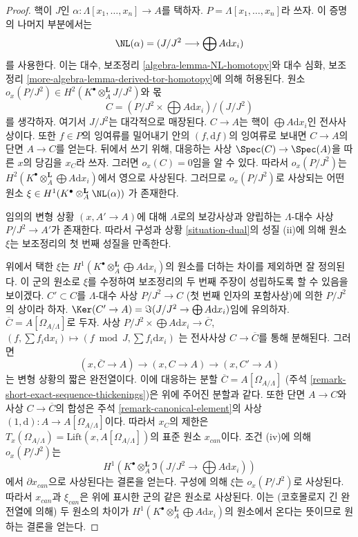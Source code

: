 \begin{proof}
핵이 $J$인 $\alpha : \Lambda[x_1, \ldots, x_n] \to A$를 택하자.
$P = \Lambda[x_1, \ldots, x_n]$라 쓰자. 이 증명의 나머지 부분에서는
$$
\NL(\alpha) = (J/J^2 \longrightarrow \bigoplus A \text{d}x_i)
$$
를 사용한다. 이는 대수, 보조정리 \ref{algebra-lemma-NL-homotopy}와
대수 심화, 보조정리 \ref{more-algebra-lemma-derived-tor-homotopy}에 의해 허용된다.
원소 $o_x(P/J^2) \in H^2(K^\bullet \otimes_A^\mathbf{L} J/J^2)$와 몫
$$
C = (P/J^2 \times \bigoplus A \text{d}x_i)/(J/J^2)
$$
를 생각하자. 여기서 $J/J^2$는 대각적으로 매장된다.
$C \to A$는 핵이 $\bigoplus A\text{d}x_i$인 전사사상이다.
또한 $f \in P$의 잉여류를 밀어내기 안의 $(f, \text{d}f)$의 잉여류로 보내면
$C \to A$의 단면 $A \to C$를 얻는다.
뒤에서 쓰기 위해, 대응하는 사상 $\Spec(C) \to \Spec(A)$을 따른
$x$의 당김을 $x_C$라 쓰자. 그러면 $o_x(C) = 0$임을 알 수 있다.
따라서 $o_x(P/J^2)$는
$H^2(K^\bullet \otimes_A^\mathbf{L} \bigoplus A\text{d}x_i)$에서 영으로 사상된다.
그러므로 $o_x(P/J^2)$로 사상되는 어떤 원소
$\xi \in H^1(K^\bullet \otimes_A^\mathbf{L} \NL(\alpha))$
가 존재한다.

\medskip\noindent
임의의 변형 상황 $(x, A' \to A)$에 대해 $A$로의 보강사상과 양립하는
$\Lambda$-대수 사상 $P/J^2 \to A'$가 존재한다.
따라서 구성과 상황 \ref{situation-dual}의 성질 (ii)에 의해 원소 $\xi$는
보조정리의 첫 번째 성질을 만족한다.

\medskip\noindent
위에서 택한 $\xi$는
$H^1(K^\bullet \otimes_A^\mathbf{L} \bigoplus A\text{d}x_i)$의 원소를
더하는 차이를 제외하면 잘 정의된다. 이 군의 원소로 $\xi$를 수정하여
보조정리의 두 번째 주장이 성립하도록 할 수 있음을 보이겠다.
$C' \subset C$를 $\Lambda$-대수 사상 $P/J^2 \to C$
(첫 번째 인자의 포함사상)에 의한 $P/J^2$의 상이라 하자.
$\Ker(C' \to A) = \Im(J/J^2 \to \bigoplus A\text{d}x_i)$임에 유의하자.
$\overline{C} = A[\Omega_{A/\Lambda}]$로 두자. 사상
$P/J^2 \times \bigoplus A \text{d}x_i \to \overline{C}$,
$(f, \sum f_i \text{d}x_i) \mapsto (f \bmod J, \sum f_i \text{d}x_i)$
는 전사사상 $C \to \overline{C}$를 통해 분해된다. 그러면
$$
(x, \overline{C} \to A) \to (x, C \to A) \to (x, C' \to A)
$$
는 변형 상황의 짧은 완전열이다. 이에 대응하는 분할
$\overline{C} = A[\Omega_{A/\Lambda}]$
(주석 \ref{remark-short-exact-sequence-thickenings})은 위에 주어진 분할과 같다.
또한 단면 $A \to C$와 사상 $C \to \overline{C}$의 합성은
주석 \ref{remark-canonical-element}의 사상
$(1, \text{d}) : A \to A[\Omega_{A/\Lambda}]$이다.
따라서 $x_C$의 제한은
$T_x(\Omega_{A/\Lambda}) = \text{Lift}(x, A[\Omega_{A/\Lambda}])$의
표준 원소 $x_{can}$이다.
조건 (iv)에 의해 $o_x(P/J^2)$는
$$
H^1(K^\bullet \otimes_A^\mathbf{L} \Im(J/J^2 \to \bigoplus A\text{d}x_i))
$$
에서 $\partial x_{can}$으로 사상된다는 결론을 얻는다.
구성에 의해 $\xi$는 $o_x(P/J^2)$로 사상된다.
따라서 $x_{can}$과 $\xi_{can}$은 위에 표시한 군의 같은 원소로 사상된다.
이는 (코호몰로지 긴 완전열에 의해) 두 원소의 차이가
$H^1(K^\bullet \otimes_A^\mathbf{L} \bigoplus A\text{d}x_i)$의 원소에서
온다는 뜻이므로 원하는 결론을 얻는다.
\end{proof}

